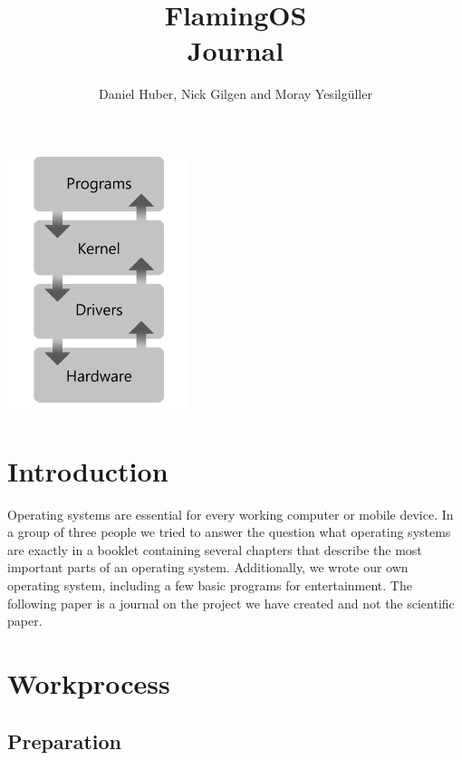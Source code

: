 \documentclass{article}
\title{%
	FlamingOS \\
	\large Journal
	}
\author{Daniel Huber, Nick Gilgen and Moray Yesilgüller}
\begin{document}
\maketitle

\vspace*{\fill}

\includegraphics[width=200px]{ostp}

\bigskip
\bigskip
\bigskip
\bigskip

\newpage

\tableofcontents
\justifying

\section{Introduction}

Operating systems are essential for every working computer or mobile device. In a group of three people we tried to answer the question what operating 
systems are exactly in a booklet containing several chapters that describe the most important parts of an operating system. Additionally, we wrote our own 
operating system, including a few basic programs for entertainment. The following paper is a journal on the project we have created
and not the scientific paper.

\section{Workprocess}

\subsection{Preparation}
\end{document}
